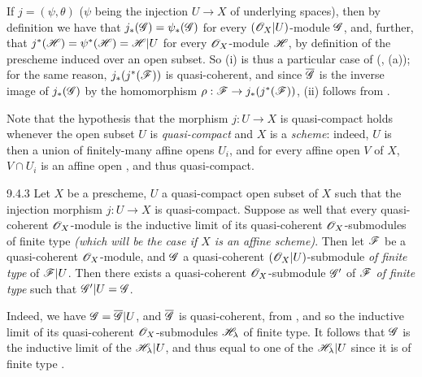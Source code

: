 If $j=(\psi,\theta)$ ($\psi$ being the injection $U\to X$ of underlying spaces), then by
definition we have that $j_*(\mathscr{G})=\psi_*(\mathscr{G})$ for every $(\mathscr{O}_X|U)$-module $\mathscr{G}$,
and, further, that $j^*(\mathscr{H})=\psi^*(\mathscr{H})=\mathscr{H}|U$ for every $\mathscr{O}_X$-module $\mathscr{H}$,
by definition of the prescheme induced over an open subset. So (i) is thus a particular case
of (, (a)); for the same reason, $j_*(j^*(\mathscr{F}))$ is quasi-coherent, and
since $\overline{\mathscr{G}}$ is the inverse image of $j_*(\mathscr{G})$ by the homomorphism
$\rho:\mathscr{F}\to j_*(j^*(\mathscr{F}))$, (ii) follows from .
 
Note that the hypothesis that the morphism $j:U\to X$ is quasi-compact
holds whenever the open subset $U$ is \emph{quasi-compact} and $X$ is a
\emph{scheme}: indeed, $U$ is then a union of finitely-many affine opens $U_i$,
and for every affine open $V$ of $X$, $V\cap U_i$ is an affine open , and
thus quasi-compact.
 
\begin{envs}[Corollary]{9.4.3}
\label{cor-1.9.4.3}
Let $X$ be a prescheme, $U$ a quasi-compact open subset of $X$ such that the injection
morphism $j:U\to X$ is quasi-compact. Suppose as well that every quasi-coherent
$\mathscr{O}_X$-module is the inductive limit of its quasi-coherent $\mathscr{O}_X$-submodules of finite type
\emph{(which will be the case if $X$ is an \emph{affine scheme})}. Then let $\mathscr{F}$ be a
quasi-coherent $\mathscr{O}_X$-module, and $\mathscr{G}$ a quasi-coherent $(\mathscr{O}_X|U)$-submodule \emph{of
finite type} of $\mathscr{F}|U$. Then there exists a quasi-coherent $\mathscr{O}_X$-submodule $\mathscr{G}'$ of
$\mathscr{F}$ \emph{of finite type} such that $\mathscr{G}'|U=\mathscr{G}$.
\end{envs}
 
Indeed, we have $\mathscr{G}=\overline{\mathscr{G}}|U$, and $\overline{\mathscr{G}}$ is quasi-coherent, from
, and so the inductive limit of its quasi-coherent $\mathscr{O}_X$-submodules
$\mathscr{H}_\lambda$ of finite type. It follows that $\mathscr{G}$ is the inductive limit of the
$\mathscr{H}_\lambda|U$, and thus equal to one of the $\mathscr{H}_\lambda|U$ since it is of finite
type .
 
